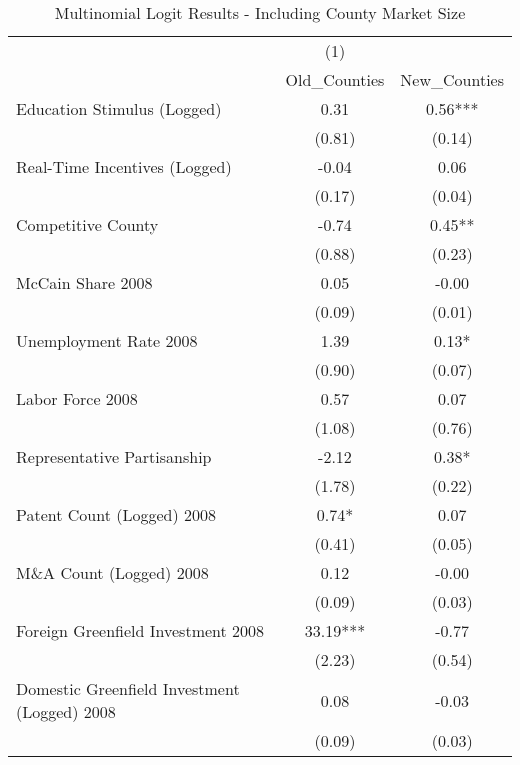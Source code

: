 \begin{table}[!htbp]\centering
\def\sym#1{\ifmmode^{#1}\else\(^{#1}\)\fi}
\caption{Multinomial Logit Results - Including County Market Size}
\begin{tabular}{l*{2}{c}}
\hline\hline
                    &         (1)   &               \\
                    &Old_Counties   &New_Counties   \\
\hline
Education Stimulus (Logged)&        0.31   &        0.56***\\
                    &      (0.81)   &      (0.14)   \\
Real-Time Incentives (Logged)&       -0.04   &        0.06   \\
                    &      (0.17)   &      (0.04)   \\
Competitive County  &       -0.74   &        0.45** \\
                    &      (0.88)   &      (0.23)   \\
McCain Share 2008   &        0.05   &       -0.00   \\
                    &      (0.09)   &      (0.01)   \\
Unemployment Rate 2008 &        1.39   &        0.13*  \\
                    &      (0.90)   &      (0.07)   \\
Labor Force 2008    &        0.57   &        0.07   \\
                    &      (1.08)   &      (0.76)   \\
Representative Partisanship&       -2.12   &        0.38*  \\
                    &      (1.78)   &      (0.22)   \\
Patent Count (Logged) 2008&        0.74*  &        0.07   \\
                    &      (0.41)   &      (0.05)   \\
M\&A Count (Logged) 2008&        0.12   &       -0.00   \\
                    &      (0.09)   &      (0.03)   \\
Foreign Greenfield Investment 2008&       33.19***&       -0.77   \\
                    &      (2.23)   &      (0.54)   \\
Domestic Greenfield Investment (Logged) 2008&        0.08   &       -0.03   \\
                    &      (0.09)   &      (0.03)   \\

\end{tabular}
\end{table}
